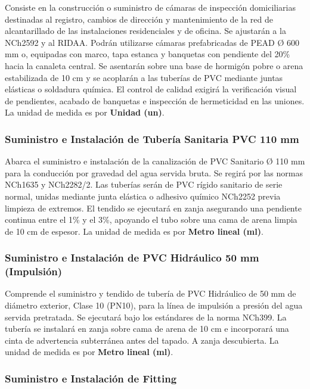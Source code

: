 Consiste en la construcción o suministro de cámaras de inspección domiciliarias destinadas al registro, cambios de dirección y mantenimiento de la red de alcantarillado de las instalaciones residenciales y de oficina. Se ajustarán a la NCh2592 y al RIDAA. Podrán utilizarse cámaras prefabricadas de PEAD Ø 600 mm o, equipadas con marco, tapa estanca y banquetas con pendiente del 20\% hacia la canaleta central. Se asentarán sobre una base de hormigón pobre o arena estabilizada de 10 cm y se acoplarán a las tuberías de PVC mediante juntas elásticas o soldadura química. El control de calidad exigirá la verificación visual de pendientes, acabado de banquetas e inspección de hermeticidad en las uniones. La unidad de medida es por \textbf{Unidad (un)}.

\subsubsection*{Suministro e Instalación de Tubería Sanitaria PVC 110 mm}

Abarca el suministro e instalación de la canalización de PVC Sanitario Ø 110 mm para la conducción por gravedad del agua servida bruta. Se regirá por las normas NCh1635 y NCh2282/2. Las tuberías serán de PVC rígido sanitario de serie normal, unidas mediante junta elástica o adhesivo químico NCh2252 previa limpieza de extremos. El tendido se ejecutará en zanja asegurando una pendiente continua entre el 1\% y el 3\%, apoyando el tubo sobre una cama de arena limpia de 10 cm de espesor. La unidad de medida es por \textbf{Metro lineal (ml)}.

\subsubsection*{Suministro e Instalación de PVC Hidráulico 50 mm (Impulsión)}

Comprende el suministro y tendido de tubería de PVC Hidráulico de 50 mm de diámetro exterior, Clase 10 (PN10), para la línea de impulsión a presión del agua servida pretratada. Se ejecutará bajo los estándares de la norma NCh399. La tubería se instalará en zanja sobre cama de arena de 10 cm e incorporará una cinta de advertencia subterránea antes del tapado. A zanja descubierta. La unidad de medida es por \textbf{Metro lineal (ml)}.

\subsubsection*{Suministro e Instalación de Fitting}

